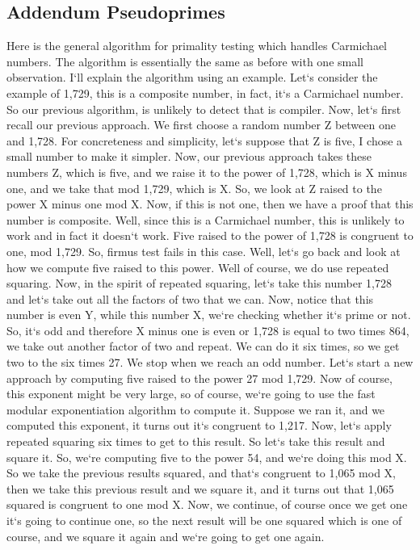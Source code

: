 \subsection{Addendum  Pseudoprimes}
Here is the general algorithm for primality testing which handles Carmichael numbers.
The algorithm is essentially the same as before with one small observation.
I`ll explain the algorithm using an example.
Let`s consider the example of 1,729, this is a composite number, in fact, it`s a Carmichael number.
So our previous algorithm, is unlikely to detect that is compiler.
Now, let`s first recall our previous approach.
We first choose a random number Z between one and 1,728.
For concreteness and simplicity, let`s suppose that Z is five, I chose a small number to make it simpler.
Now, our previous approach takes these numbers Z, which is five, and we raise it to the power of 1,728, which is X minus one, and we take that mod 1,729, which is X\@.
So, we look at Z raised to the power X minus one mod X\@.
Now, if this is not one, then we have a proof that this number is composite.
Well, since this is a Carmichael number, this is unlikely to work and in fact it doesn`t work.
Five raised to the power of 1,728 is congruent to one, mod 1,729.
So, firmus test fails in this case.
Well, let`s go back and look at how we compute five raised to this power.
Well of course, we do use repeated squaring.
Now, in the spirit of repeated squaring, let`s take this number 1,728 and let`s take out all the factors of two that we can.
Now, notice that this number is even Y, while this number X, we`re checking whether it`s prime or not.
So, it`s odd and therefore X minus one is even or 1,728 is equal to two times 864, we take out another factor of two and repeat.
We can do it six times, so we get two to the six times 27.
We stop when we reach an odd number.
Let`s start a new approach by computing five raised to the power 27 mod 1,729.
Now of course, this exponent might be very large, so of course, we`re going to use the fast modular exponentiation algorithm to compute it.
Suppose we ran it, and we computed this exponent, it turns out it`s congruent to 1,217.
Now, let`s apply repeated squaring six times to get to this result.
So let`s take this result and square it.
So, we`re computing five to the power 54, and we`re doing this mod X\@.
So we take the previous results squared, and that`s congruent to 1,065 mod X, then we take this previous result and we square it, and it turns out that 1,065 squared is congruent to one mod X\@.
Now, we continue, of course once we get one it`s going to continue one, so the next result will be one squared which is one of course, and we square it again and we`re going to get one again.
